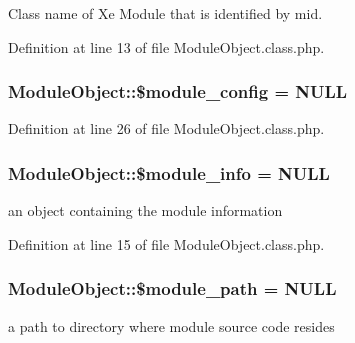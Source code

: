Class name of Xe Module that is identified by mid. 



Definition at line 13 of file Module\+Object.\+class.\+php.

\subsubsection[{\texorpdfstring{\$module\+\_\+config}{$module_config}}]{\setlength{\rightskip}{0pt plus 5cm}Module\+Object\+::\$module\+\_\+config = N\+U\+LL}\hypertarget{classModuleObject_aed2cac16f365c2b463772e3eeb0c1402}{}\label{classModuleObject_aed2cac16f365c2b463772e3eeb0c1402}


Definition at line 26 of file Module\+Object.\+class.\+php.

\subsubsection[{\texorpdfstring{\$module\+\_\+info}{$module_info}}]{\setlength{\rightskip}{0pt plus 5cm}Module\+Object\+::\$module\+\_\+info = N\+U\+LL}\hypertarget{classModuleObject_ac1c9807e77270f2e2abe4f79e1cd2987}{}\label{classModuleObject_ac1c9807e77270f2e2abe4f79e1cd2987}


an object containing the module information 



Definition at line 15 of file Module\+Object.\+class.\+php.

\subsubsection[{\texorpdfstring{\$module\+\_\+path}{$module_path}}]{\setlength{\rightskip}{0pt plus 5cm}Module\+Object\+::\$module\+\_\+path = N\+U\+LL}\hypertarget{classModuleObject_aba24677d5cf457dc33d9af3d8a3b3a14}{}\label{classModuleObject_aba24677d5cf457dc33d9af3d8a3b3a14}


a path to directory where module source code resides 



